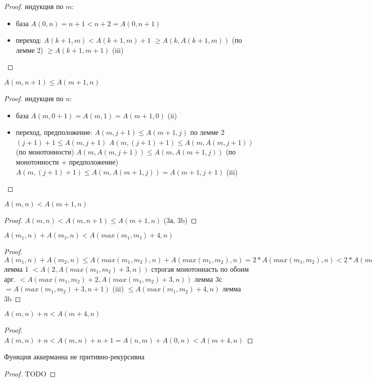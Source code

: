 \begin{proof}
индукция по $m$:
\begin{itemize}
\item база
$A(0, n) = n + 1 < n + 2 = A(0, n + 1)$
\item переход:
$A(k + 1, m) < A(k + 1, m) + 1$
$\geq A(k, A(k + 1, m))$ (по лемме 2)
$\geq A(k + 1, m + 1)$   (iii)
\end{itemize}
\end{proof}
\begin{lemma}
$A(m, n + 1) \leq A(m + 1, n)$
\end{lemma}
\begin{proof}
индукция по $n$:
\begin{itemize}
\item база
$A(m, 0 + 1) = A(m, 1) = A(m + 1, 0)$ (ii)
\item переход, предположение: $A(m, j + 1) \leq A(m + 1, j)$
по лемме 2 $(j + 1) + 1 \leq A(m, j + 1)$
$A(m, (j + 1) + 1) \leq A(m, A(m, j + 1))$ (по монотонности)
$A(m, A(m, j + 1)) \leq A(m, A(m + 1, j))$ (по монотонности + предположение)
$A(m, (j + 1) + 1) \leq A(m, A(m + 1, j)) = A(m + 1, j + 1)$ (iii)
\end{itemize}
\end{proof}
\begin{lemma}
$A(m, n) < A(m + 1, n)$
\end{lemma}
\begin{proof}
$A(m, n) < A(m, n + 1) \leq A(m + 1, n)$ (3а, 3b)
\end{proof}
\begin{lemma}
$A(m_1, n) + A(m₂, n) < A(max(m_1, m₂) + 4, n)$
\end{lemma}
\begin{proof}
$A(m_1, n) + A(m_2, n)
≤ A(max(m_1, m_2), n) + A(max(m_1, m_2), n)
= 2 * A(max(m_1, m_2), n)
< 2 * A(max(m_1, m_2), n) + 3
= A(2, A(max(m_1, m_2), n))$     лемма 1
$< A(2, A(max(m_1, m_2) + 3, n))$ строгая монотоннасть по обоим арг.
$< A(max(m_1, m_2) + 2, A(max(m_1, m_2) + 3, n))$ лемма 3с
$= A(max(m_1, m_2) + 3, n + 1)$   (iii)
$≤ A(max(m_1, m_2) + 4, n)$       лемма 3b
\end{proof}
\begin{lemma}
$A(m, n) + n < A(m + 4, n)$
\end{lemma}
\begin{proof}
$A(m, n) + n
< A(m, n) + n + 1
= A(n, m) + A(0, n)
< A(m + 4, n)$
\end{proof}
\begin{theorem}
Функция аккерманна не притивно-рекурсивна
\end{theorem}
\begin{proof}
TODO
\end{proof}
\iffalse
